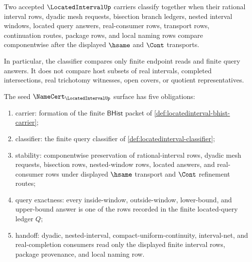 \begin{definition}
\label{def:locatedinterval-classifier}
Two accepted $\LocatedIntervalUp$ carriers classify together when their rational interval rows, dyadic mesh requests, bisection branch ledgers, nested interval windows, located query answers, real-consumer rows, transport rows, continuation routes, package rows, and local naming rows compare componentwise after the displayed $\hsame$ and $\Cont$ transports.

In particular, the classifier compares only finite endpoint reads and finite query answers. It does not compare host subsets of real intervals, completed intersections, real trichotomy witnesses, open covers, or quotient representatives.
\end{definition}

\begin{theorem}
\label{thm:locatedinterval-namecert-obligations}
The seed $\NameCert_{\LocatedIntervalUp}$ surface has five obligations:
\begin{enumerate}
\item carrier: formation of the finite $\mathsf{BHist}$ packet of \autoref{def:locatedinterval-bhist-carrier};
\item classifier: the finite query classifier of \autoref{def:locatedinterval-classifier};
\item stability: componentwise preservation of rational-interval rows, dyadic mesh requests, bisection rows, nested-window rows, located answers, and real-consumer rows under displayed $\hsame$ transport and $\Cont$ refinement routes;
\item query exactness: every inside-window, outside-window, lower-bound, and upper-bound answer is one of the rows recorded in the finite located-query ledger $Q$;
\item handoff: dyadic, nested-interval, compact-uniform-continuity, interval-net, and real-completion consumers read only the displayed finite interval rows, package provenance, and local naming row.
\end{enumerate}
\end{theorem}
